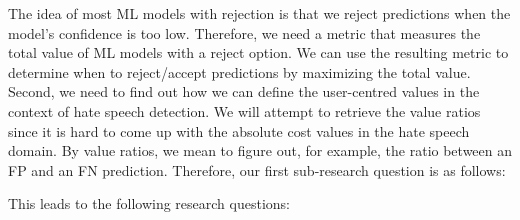 The idea of most ML models with rejection is that we reject predictions when the model's confidence is too low. Therefore, we need a metric that measures the total value of ML models with a reject option. We can use the resulting metric to determine when to reject/accept predictions by maximizing the total value. Second, we need to find out how we can define the user-centred values in the context of hate speech detection. We will attempt to retrieve the value ratios since it is hard to come up with the absolute cost values in the hate speech domain. By value ratios, we mean to figure out, for example, the ratio between an FP and an FN prediction. Therefore, our first sub-research question is as follows:

This leads to the following research questions:


\noindent{}


